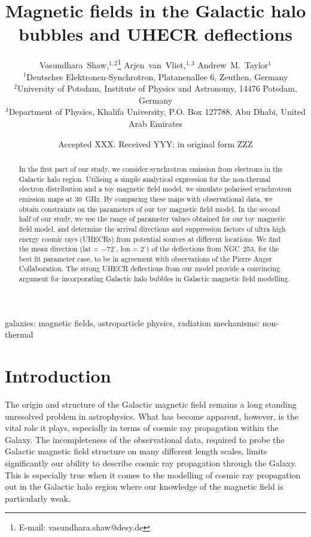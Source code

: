 \documentclass[usenatbib]{mnras}
\title{Magnetic fields in the Galactic halo bubbles and UHECR deflections}
\author[V.~Shaw et al.]{
Vasundhara~Shaw,$^{1,2}$\thanks{E-mail: vasundhara.shaw@desy.de}
Arjen~van~Vliet,$^{1,3}$
Andrew~M.~Taylor$^{1}$
\\
$^{1}$Deutsches Elektronen-Synchrotron, Platanenallee 6, Zeuthen, Germany \\ %
$^{2}$University of Potsdam, Institute of Physics and Astronomy, 14476 Potsdam, Germany \\
$^{3}$Department of Physics, Khalifa University, P.O. Box 127788, Abu Dhabi, United Arab Emirates
}
\date{Accepted XXX. Received YYY; in original form ZZZ}
\begin{document}
\maketitle

\begin{abstract}
In the first part of our study, we consider synchrotron emission from electrons in the Galactic halo region. Utilising a simple analytical expression for the non-thermal electron distribution and a toy magnetic field model, we simulate polarised synchrotron emission maps at 30~GHz. By comparing these maps with observational data, we obtain constraints on the parameters of our toy magnetic field model. In the second half of our study, we use the range of parameter values obtained for our toy magnetic field model, and determine the arrival directions and suppression factors of ultra high energy cosmic rays (UHECRs) from potential sources at different locations. We find the mean direction (lat = $-72^{\circ}$, lon = $2^{\circ}$) of the deflections from NGC~253, for the best fit parameter case, to be in agreement with observations of the Pierre Auger Collaboration. The strong UHECR deflections from our model provide a convincing argument for incorporating Galactic halo bubbles in Galactic magnetic field modelling.
\end{abstract}

\begin{keywords}
galaxies: magnetic fields, astroparticle physics, radiation mechanisms: non-thermal
\end{keywords}


\section{Introduction}
\label{Introducion}

The origin and structure of the Galactic magnetic field remains a long standing unresolved problem in astrophysics. What has become apparent, however, is the vital role it plays, especially in terms of cosmic ray propagation within the Galaxy. The incompleteness of the observational data, required to probe the Galactic magnetic field structure on many different length scales, limits significantly our ability to describe cosmic ray propagation through the Galaxy. This is especially true when it comes to the modelling of cosmic ray propagation out in the Galactic halo region where our knowledge of the magnetic field is particularly weak.
\end{document}
